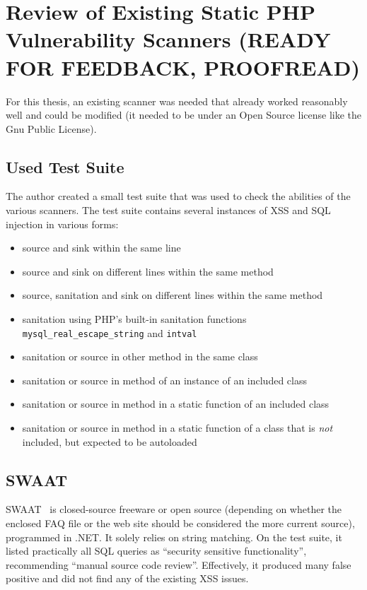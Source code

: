 \chapter{Review of Existing Static PHP Vulnerability Scanners (READY FOR FEEDBACK, PROOFREAD)}
\label{scanners}

For this thesis, an existing scanner was needed that already worked reasonably well and could be modified (\ie it needed to be under an Open Source license like the Gnu Public License).

\section{Used Test Suite}
The author created a small test suite that was used to check the abilities of the various scanners. The test suite contains several instances of XSS and SQL injection in various forms:
\begin{itemize}
 \item source and sink within the same line
 \item source and sink on different lines within the same method
 \item source, sanitation and sink on different lines within the same method
 \item sanitation using PHP's built-in sanitation functions \texttt{mysql\_real\_escape\_string} and \texttt{intval}
 \item sanitation or source in other method in the same class
 \item sanitation or source in method of an instance of an included class
 \item sanitation or source in method in a static function of an included class
 \item sanitation or source in method in a static function of a class that is \emph{not} included, but expected to be autoloaded
\end{itemize}

\section{SWAAT}
\label{swaat}
SWAAT~\cite{swaat} is closed-source freeware or open source (depending on whether the enclosed FAQ file or the web site should be considered the more current source), programmed in .NET. It solely relies on string matching. On the test suite, it listed practically all SQL queries as ``security sensitive functionality'', recommending ``manual source code review''. Effectively, it produced many false positive and did not find any of the existing XSS issues.

